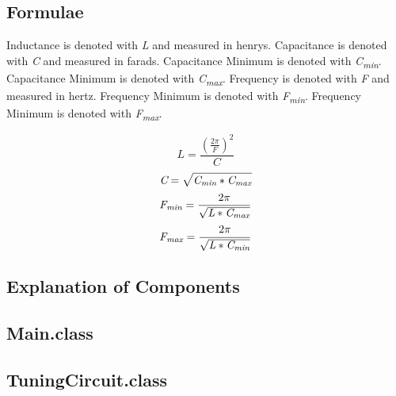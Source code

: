 \documentclass[12pt]{article}
\begin{document}
\newpage %



\begin{center}
\section{Formulae}
\end{center}
Inductance is denoted with \textit{L} and measured in henrys.
Capacitance is denoted with \textit{C} and measured in farads.
Capacitance Minimum is denoted with \textit{C\textsubscript{min}}.
Capacitance Minimum is denoted with \textit{C\textsubscript{max}}.
Frequency is denoted with \textit{F} and measured in hertz.
Frequency Minimum is denoted with \textit{F\textsubscript{min}}.
Frequency Minimum is denoted with \textit{F\textsubscript{max}}.
\par %
\begin{equation}
\textit{L} = \frac{(\frac{2\pi}{\textit{F}})^2}{\textit{C}}
\end{equation}
\begin{equation}
\textit{C} = \sqrt{\textit{C\textsubscript{min}}*\textit{C\textsubscript{max}}}
\end{equation}
\begin{equation}
\textit{F\textsubscript{min}} = \frac{2\pi}{\sqrt{\textit{L}*\textit{C\textsubscript{max}}}}
\end{equation}
\begin{equation}
\textit{F\textsubscript{max}} = \frac{2\pi}{\sqrt{\textit{L}*\textit{C\textsubscript{min}}}}
\end{equation}



\newpage %



\begin{center}
\section{Explanation of Components}
\end{center}
\subsection{Main.class}
\subsection{TuningCircuit.class}
\end{document}
